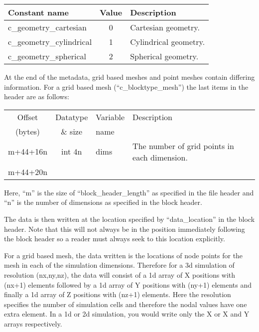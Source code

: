 \documentclass[12pt]{article}
\begin{document}
\begin{center}
\begin{tabularx}{0.9\textwidth}[!hbt]{lcX}
  Constant name & Value & Description
  \\\toprule

  c\_geometry\_cartesian & 0 & Cartesian geometry.
  \\\midrule

  c\_geometry\_cylindrical & 1 & Cylindrical geometry.
  \\\midrule

  c\_geometry\_spherical & 2 & Spherical geometry.
\end{tabularx}
\end{center}\vspace{10pt}

At the end of the metadata, grid based meshes and point meshes contain
differing information. For a grid based mesh (``c\_blocktype\_mesh'')
the last items in the header are as follows:\\

\begin{center}
\begin{tabularx}{0.9\textwidth}[!hbt]{cclX}
  Offset & Datatype & Variable & Description\\
  (bytes) & \& size & name &
  \\\toprule

  m+44+16n & int 4n & dims & The number of grid points in each dimension.
  \\\midrule

  m+44+20n &
\end{tabularx}
\end{center}\vspace{10pt}

Here, ``m'' is the size of ``block\_header\_length'' as specified in the file
header and ``n'' is the number of dimensions as specified in the block header.

The data is then written at the location specified by ``data\_location'' in
the block header. Note that this will not always be in the position immediately
following the block header so a reader must always seek to this location
explicitly.

For a grid based mesh, the data written is the locations of node points for
the mesh in each of the simulation dimensions. Therefore for a
3d simulation of resolution (nx,ny,nz), the data will consist of 
a 1d array of X positions with (nx+1) elements followed by a 1d array of
Y positions with (ny+1) elements and finally a 1d array of Z positions with
(nz+1) elements. Here the resolution specifies the number of simulation cells
and therefore the nodal values have one extra element. In a 1d or 2d simulation,
you would write only the X or X and Y arrays respectively.
\end{document}
